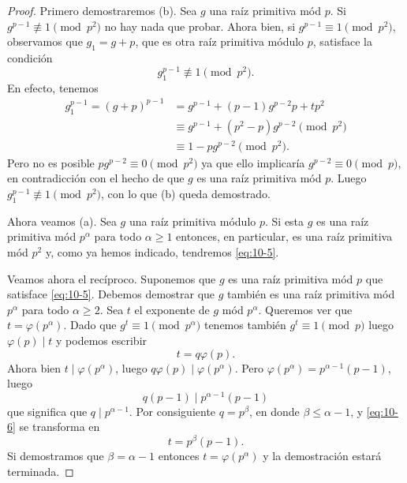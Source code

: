\documentclass[12pt,a4paper]{book}
\begin{document}
    \begin{proof}
        Primero demostraremos (b). Sea $g$ una raíz primitiva mód $p$. Si
        $g^{p-1}\not\equiv1\pmod{p^{2}}$ no hay nada que probar. Ahora bien, si
        $g^{p-1}\equiv1\pmod{p^{2}}$, observamos que $g_{1}=g+p$, que es otra raíz primitiva
        módulo $p$, satisface la condición
        \begin{equation*}
            g_{1}^{p-1}\not\equiv1\pmod{p^{2}}.
        \end{equation*}
        En efecto, tenemos
        \begin{align*}
            g_{1}^{p-1}=(g+p)^{p-1}&=g^{p-1}+(p-1)g^{p-2}p+tp^{2}\\
            &\equiv g^{p-1}+(p^{2}-p)g^{p-2}\pmod{p^{2}}\\
            &\equiv1-pg^{p-2}\pmod{p^{2}}.
        \end{align*}
        Pero no es posible $pg^{p-2}\equiv0\pmod{p^{2}}$ ya que ello implicaría
        $g^{p-2}\equiv0\pmod{p}$, en contradicción con el hecho de que $g$ es una raíz
        primitiva mód $p$. Luego $g_{1}^{p-1}\not\equiv1\pmod{p^{2}}$, con lo que (b) queda
        demostrado.

        Ahora veamos (a). Sea $g$ una raíz primitiva módulo $p$. Si esta $g$ es una raíz
        primitiva mód $p^{\alpha}$ para todo $\alpha\geq1$ entonces, en particular, es una
        raíz primitiva mód $p^{2}$ y, como ya hemos indicado, tendremos \eqref{eq:10-5}.

        Veamos ahora el recíproco. Suponemos que $g$ es una raíz primitiva mód $p$ que
        satisface \eqref{eq:10-5}. Debemos demostrar que $g$ también es una raíz primitiva
        mód $p^{\alpha}$ para todo $\alpha\geq2$. Sea $t$ el exponente de $g$ mód
        $p^{\alpha}$. Queremos ver que $t=\varphi(p^{\alpha})$. Dado que $g^{t}\equiv1\pmod{p^{\alpha}}$
        tenemos también $g^{t}\equiv1\pmod{p}$ luego $\varphi(p)\mid t$ y podemos escribir
        \begin{equation}\label{eq:10-6}
            t=q\varphi(p).
        \end{equation}
        Ahora bien $t\mid\varphi(p^{\alpha})$, luego $q\varphi(p)\mid\varphi(p^{\alpha})$.
        Pero $\varphi(p^{\alpha})=p^{\alpha-1}(p-1)$, luego
        \begin{equation*}
            q(p-1)\mid p^{\alpha-1}(p-1)
        \end{equation*}
        que significa que $q\mid p^{\alpha-1}$. Por consiguiente $q=p^{\beta}$, en donde
        $\beta\leq\alpha-1$, y \eqref{eq:10-6} se transforma en
        \begin{equation*}
            t=p^{\beta}(p-1).
        \end{equation*}
        Si demostramos que $\beta=\alpha-1$ entonces $t=\varphi(p^{\alpha})$ y la
        demostración estará terminada.


\end{proof}
\end{document}
